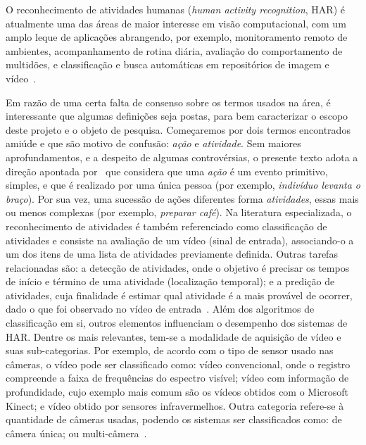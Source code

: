 O reconhecimento de atividades humanas (\emph{human activity recognition}, HAR) é atualmente uma das áreas de maior interesse em visão computacional, com um amplo leque de aplicações abrangendo, por exemplo, monitoramento remoto de ambientes, acompanhamento de rotina diária, avaliação do comportamento de multidões, e classificação e busca automáticas em repositórios de imagem e vídeo~\parencite{hussain-2020,jegham-2020}.
%

Em razão de uma certa falta de consenso sobre os termos usados na área, é interessante que algumas definições seja postas, para bem caracterizar o escopo deste projeto e o objeto de pesquisa. 
Começaremos por dois termos encontrados amiúde e que são motivo de confusão: \emph{ação} e \emph{atividade}. Sem maiores aprofundamentos, e a despeito de algumas controvérsias, o presente texto adota a direção apontada por~\textcite{herath-2017} que considera que uma \emph{ação} é um evento primitivo, simples, e que é realizado por uma única pessoa (por exemplo, \emph{indivíduo levanta o braço}). Por sua vez, uma sucessão de ações diferentes forma \emph{atividades}, essas mais ou menos complexas (por exemplo, \emph{preparar café}).
%
Na literatura especializada, o reconhecimento de atividades é também referenciado como classificação de atividades e consiste na avaliação de um vídeo (sinal de entrada), associando-o a um dos itens de uma lista de atividades previamente definida. Outras tarefas relacionadas são: a detecção de atividades, onde o objetivo é precisar os tempos de início e término de uma atividade (localização temporal); e a predição de atividades, cuja finalidade é estimar qual atividade é a mais provável de  ocorrer, dado o que foi observado no vídeo de entrada~\parencite{yao-2019}. %
%
Além dos algoritmos de classificação em si, outros elementos influenciam o desempenho dos sistemas de HAR. Dentre os mais relevantes, tem-se a modalidade de aquisição de vídeo e suas sub-categorias. Por exemplo, de acordo com o tipo de sensor usado nas câmeras, o vídeo pode ser classificado como: vídeo convencional, onde o registro compreende a faixa de frequências do espectro visível; vídeo com informação de profundidade, cujo exemplo mais comum são os vídeos obtidos com o Microsoft Kinect; e vídeo obtido por sensores infravermelhos. Outra categoria refere-se à quantidade de câmeras usadas, podendo os sistemas ser classificados como: de câmera única; ou multi-câmera~\parencite{yao-2019}.
